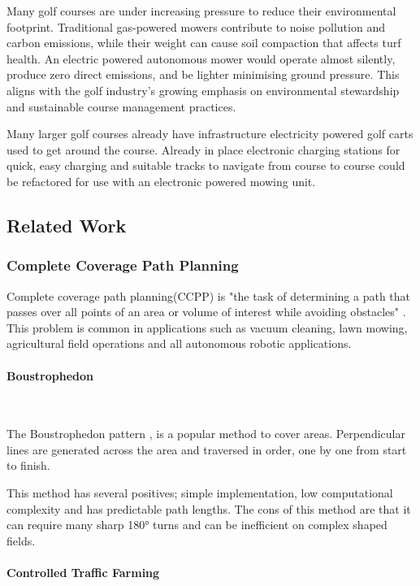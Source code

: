 \documentclass[final]{cmpreport_02}
\begin{document}
Many golf courses are under increasing pressure to reduce their environmental footprint. Traditional gas-powered mowers contribute to noise pollution and carbon emissions, while their weight can cause soil compaction that affects turf health.
An electric powered autonomous mower would operate almost silently, produce zero direct emissions, and be lighter minimising ground pressure. This aligns with the golf industry's growing emphasis on environmental stewardship and sustainable course management practices.

Many larger golf courses already have infrastructure electricity powered golf carts used to get around the course.
Already in place electronic charging stations for quick, easy charging and suitable tracks to navigate from course to course could be refactored for use with an electronic powered mowing unit.

\subsection{Related Work}
\subsubsection{Complete Coverage Path Planning}
Complete coverage path planning(CCPP) is "the task of determining a path that passes over all points of an area or volume of interest while avoiding obstacles" \citep{zhao2023complete}.
This problem is common in applications such as vacuum cleaning, lawn mowing, agricultural field operations and all autonomous robotic applications.

\paragraph{Boustrophedon} \

The Boustrophedon pattern \citep{boustrophedon}, is a popular method to cover areas.
Perpendicular lines are generated across the area and traversed in order, one by one from start to finish.

This method has several positives; simple implementation, low computational complexity and has predictable path lengths.
The cons of this method are that it can require many sharp 180° turns and can be inefficient on complex shaped fields.

\paragraph{Controlled Traffic Farming} \
\end{document}
